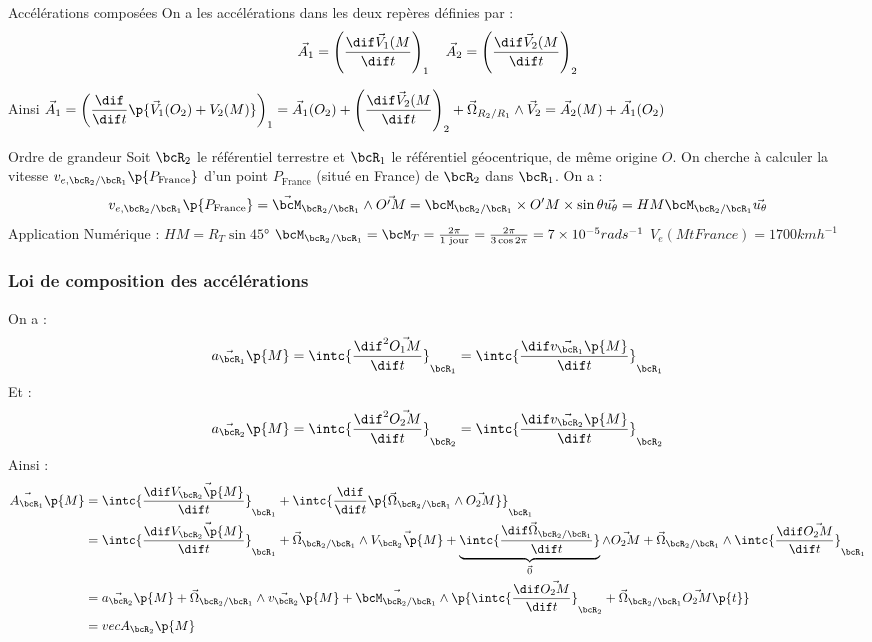     \begin{definition}{Accélérations composées}{}
        On a les accélérations dans les deux repères définies par :
        \[\vec A_1 = \left( \dfrac{\dif \vec V_1(M}{\dif t}\right)_1 \quad 
        \vec A_2 = \left( \dfrac{\dif \vec V_2(M}{\dif t}\right)_2\]

        Ainsi \( \vec A_1 = \left( \dfrac{\dif}{\dif t} \p{\vec V_1(O_2) + V_2(M )}\right)_1 = 
        \vec A_1(O_2) + \left(\dfrac{\dif \vec V_2(M}{\dif t}\right)_2 + \vec \Omega_{R_2/R_1} \wedge \vec V_2 = \vec A_2(M) + \vec A_1(O_2)\)
    \end{definition}
    
    \begin{example}{Ordre de grandeur}{}
        Soit $\bcR_2$ le référentiel terrestre et $\bcR_1$ le référentiel géocentrique, de même origine $O$. On cherche à calculer la vitesse $v_{e, \bcR_2 / \bcR_1}\p{P_\text{France}}$ d'un point $P_\text{France}$ (situé en France) de $\bcR_2$ dans $\bcR_1$. On a :
        \[ v_{e, \bcR_2 / \bcR_1}\p{P_\text{France}} = \vec \bcM_{\bcR_2 / \bcR_1} \wedge \vec{O'M} = \bcM_{\bcR_2 / \bcR_1} \times O'M \times \sin{\theta} \vec{u_\theta} = HM \bcM_{\bcR_2 / \bcR_1} \vec{u_\theta}\]
        Application Numérique : $HM = R_T \sin{45°}$
        $\bcM_{\bcR_2 / \bcR_1} = \bcM_T = \frac{2 \pi}{\text{1 jour}} = \frac{2 \pi}{3 \cos{2 \pi}} = 7 \times 10^{-5} rad s^{-1}$
        $V_e (Mt France) = 1700 km h^{-1}$
    \end{example}
    
    \subsubsection{Loi de composition des accélérations}
    
    On a :
    \[ \vec{a_{\bcR_1}}\p{M} = \intc{\dfrac{\dif^2 \vec{O_1M}}{\dif t}}_{\bcR_1} = \intc{\dfrac{\dif \vec{v_{\bcR_1}}\p{M}}{\dif t}}_{\bcR_1}\]
    Et :
    \[ \vec{a_{\bcR_2}}\p{M} = \intc{\dfrac{\dif^2 \vec{O_2M}}{\dif t}}_{\bcR_2} = \intc{\dfrac{\dif \vec{v_{\bcR_2}}\p{M}}{\dif t}}_{\bcR_2}\]
    Ainsi :
    \begin{align*}
        \vec{A_{\bcR_1}}\p{M} &= \intc{\dfrac{\dif \vec{V_{\bcR_2}\p{M}}}{\dif t}}_{\bcR_1} + \intc{\dfrac{\dif}{\dif t}\p{\vec \Omega_{\bcR_2/\bcR_1} \wedge \vec{O_2M}}}_{\bcR_1}\\
        &= \intc{\dfrac{\dif \vec{V_{\bcR_2}\p{M}}}{\dif t}}_{\bcR_1} + \vec \Omega_{\bcR_2/\bcR_1} \wedge \vec{V_{\bcR_2}\p{M}} + \underbrace{\intc{\dfrac{\dif \vec \Omega_{\bcR_2/\bcR_1}}{\dif t}}}_{\vec 0} \wedge \vec{O_2M} + \vec \Omega_{\bcR_2/\bcR_1} \wedge \intc{\dfrac{\dif \vec{O_2M}}{\dif t}}_{\bcR_1}\\
        &= \vec{a_{\bcR_2}}\p{M} + \vec \Omega_{\bcR_2/\bcR_1} \wedge \vec{v_{\bcR_2}}\p{M} + \vec{\bcM_{\bcR_2/\bcR_1}} \wedge \p{\intc{\dfrac{\dif \vec{O_2M}}{\dif t}}_{\bcR_2} + \vec \Omega_{\bcR_2/\bcR_1} \vec{O_2M}\p{t}}\\
        &= vec{A_{\bcR_2}}\p{M}
    \end{align*} 
    
